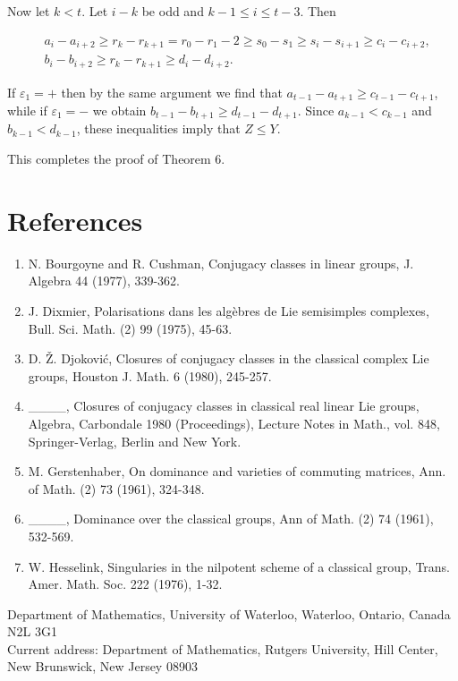 \documentclass[10pt]{article}
\begin{document}
Now let $k<t$. Let $i-k$ be odd and $k-1 \leqslant i \leqslant t-3$. Then

$$
\begin{aligned}
& a_{i}-a_{i+2} \geqslant r_{k}-r_{k+1}=r_{0}-r_{1}-2 \geqslant s_{0}-s_{1} \geqslant s_{i}-s_{i+1} \geqslant c_{i}-c_{i+2}, \\
& b_{i}-b_{i+2} \geqslant r_{k}-r_{k+1} \geqslant d_{i}-d_{i+2} .
\end{aligned}
$$

If $\varepsilon_{1}=+$ then by the same argument we find that $a_{t-1}-a_{t+1} \geqslant c_{t-1}-c_{t+1}$, while if $\varepsilon_{1}=-$ we obtain $b_{t-1}-b_{t+1} \geqslant d_{t-1}-d_{t+1}$. Since $a_{k-1}<c_{k-1}$ and $b_{k-1}<d_{k-1}$, these inequalities imply that $Z \leqslant Y$.

This completes the proof of Theorem 6.

\section*{References}
\begin{enumerate}
  \item N. Bourgoyne and R. Cushman, Conjugacy classes in linear groups, J. Algebra 44 (1977), 339-362.
  \item J. Dixmier, Polarisations dans les algèbres de Lie semisimples complexes, Bull. Sci. Math. (2) 99 (1975), 45-63.
  \item D. Ž. Djoković, Closures of conjugacy classes in the classical complex Lie groups, Houston J. Math. 6 (1980), 245-257.
  \item \_\_\_\_, Closures of conjugacy classes in classical real linear Lie groups, Algebra, Carbondale 1980 (Proceedings), Lecture Notes in Math., vol. 848, Springer-Verlag, Berlin and New York.
  \item M. Gerstenhaber, On dominance and varieties of commuting matrices, Ann. of Math. (2) 73 (1961), 324-348.
  \item \_\_\_\_, Dominance over the classical groups, Ann of Math. (2) 74 (1961), 532-569.
  \item W. Hesselink, Singularies in the nilpotent scheme of a classical group, Trans. Amer. Math. Soc. 222 (1976), 1-32.
\end{enumerate}

Department of Mathematics, University of Waterloo, Waterloo, Ontario, Canada N2L 3G1\\
Current address: Department of Mathematics, Rutgers University, Hill Center, New Brunswick, New Jersey 08903
\end{document}
